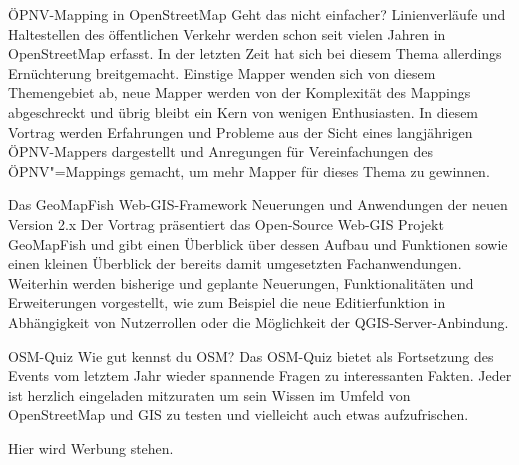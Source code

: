 %
{ÖPNV-Mapping in OpenStreetMap}%
{Geht das nicht einfacher?}%
{Linienverläufe und Haltestellen des öffentlichen Verkehr werden schon seit vielen Jahren in
OpenStreetMap erfasst. In der letzten Zeit hat sich bei diesem Thema allerdings Ernüchterung
breitgemacht. Einstige Mapper wenden sich von diesem Themengebiet ab, neue Mapper werden von der
Komplexität des Mappings abgeschreckt und übrig bleibt ein Kern von wenigen Enthusiasten.
In diesem
Vortrag werden Erfahrungen und Probleme aus der Sicht eines langjährigen ÖPNV-Mappers dargestellt
und Anregungen für Vereinfachungen des ÖPNV"=Mappings gemacht, um mehr Mapper für dieses Thema zu
gewinnen.}

%
{Das GeoMapFish Web-GIS-Framework}%
{Neuerungen und Anwendungen der neuen Version 2.x}%
{Der Vortrag präsentiert das Open-Source Web-GIS Projekt GeoMapFish und gibt einen Überblick über
dessen Aufbau und Funktionen sowie einen kleinen Überblick der bereits damit umgesetzten
Fachanwendungen. Weiterhin werden bisherige und geplante Neuerungen, Funktionalitäten und
Erweiterungen vorgestellt, wie zum Beispiel die neue Editierfunktion in Abhängigkeit von
Nutzerrollen oder die Möglichkeit der QGIS-Server-Anbindung.}


%
{OSM-Quiz}%
{Wie gut kennst du OSM?}%
{Das OSM-Quiz bietet als Fortsetzung des Events vom letztem Jahr wieder spannende Fragen zu
interessanten Fakten. Jeder ist herzlich eingeladen mitzuraten um sein Wissen im Umfeld von
OpenStreetMap und GIS zu testen und vielleicht auch etwas aufzufrischen.}

\newpage
Hier wird Werbung stehen.

